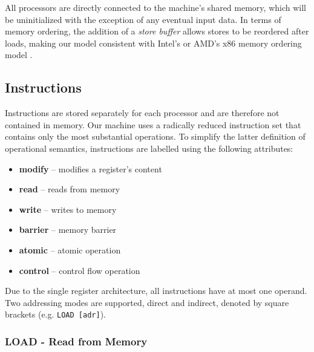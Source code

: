 All processors are directly connected to the machine's shared memory, which will be uninitialized with the exception of any eventual input data.
In terms of memory ordering, the addition of a \emph{store buffer} allows stores to be reordered after loads, making our model consistent with Intel's or AMD's x86 memory ordering model \cite{intel, amd}.

\subsection{Instructions}


Instructions are stored separately for each processor and are therefore not contained in memory.
Our machine uses a radically reduced instruction set that contains only the most substantial operations.
To simplify the latter definition of operational semantics, instructions are labelled using the following attributes:



\begin{itemize}
  \item \textbf{modify} -- modifies a register's content
  \item \textbf{read} -- reads from memory
  \item \textbf{write} -- writes to memory
  \item \textbf{barrier} -- memory barrier%
  \item \textbf{atomic} -- atomic operation%
  \item \textbf{control} -- control flow operation
\end{itemize}

Due to the single register architecture, all instructions have at most one operand.
Two addressing modes are supported, direct and indirect, denoted by square brackets (e.g. \texttt{LOAD [adr]}).

\subsubsection{LOAD - Read from Memory}

